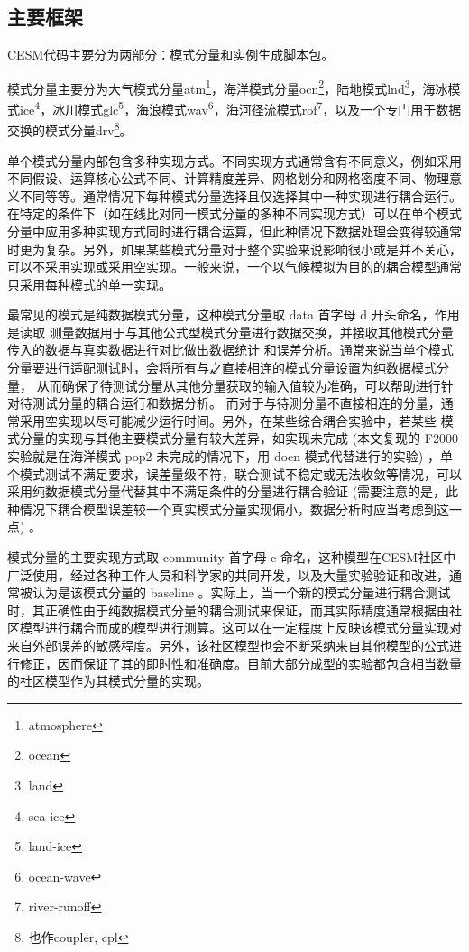 \subsection{主要框架}

CESM代码主要分为两部分：模式分量和实例生成脚本包。

模式分量主要分为大气模式分量atm\footnote {atmosphere}，海洋模式分量ocn\footnote {ocean}，陆地模式lnd\footnote {land}，海冰模式ice\footnote {sea-ice}，冰川模式glc\footnote {land-ice}，海浪模式wav\footnote {ocean-wave}，海河径流模式rof\footnote {river-runoff}，以及一个专门用于数据交换的模式分量drv\footnote {也作coupler, cpl}。

单个模式分量内部包含多种实现方式。不同实现方式通常含有不同意义，例如采用不同假设、运算核心公式不同、计算精度差异、网格划分和网格密度不同、物理意义不同等等。通常情况下每种模式分量选择且仅选择其中一种实现进行耦合运行。在特定的条件下（如在线比对同一模式分量的多种不同实现方式）可以在单个模式分量中应用多种实现方式同时进行耦合运算，但此种情况下数据处理会变得较通常时更为复杂。另外，如果某些模式分量对于整个实验来说影响很小或是并不关心，可以不采用实现或采用空实现。一般来说，一个以气候模拟为目的的耦合模型通常只采用每种模式的单一实现。

最常见的模式是纯数据模式分量，这种模式分量取 data 首字母 d 开头命名，作用是读取
测量数据用于与其他公式型模式分量进行数据交换，并接收其他模式分量传入的数据与真实数据进行对比做出数据统计
和误差分析。通常来说当单个模式分量要进行适配测试时，会将所有与之直接相连的模式分量设置为纯数据模式分量，
从而确保了待测试分量从其他分量获取的输入值较为准确，可以帮助进行针对待测试分量的耦合运行和数据分析。
而对于与待测分量不直接相连的分量，通常采用空实现以尽可能减少运行时间。另外，在某些综合耦合实验中，若某些
模式分量的实现与其他主要模式分量有较大差异，如实现未完成
(本文复现的 F2000 实验就是在海洋模式 pop2 未完成的情况下，用 docn 模式代替进行的实验)
，单个模式测试不满足要求，误差量级不符，联合测试不稳定或无法收敛等情况，可以采用纯数据模式分量代替其中不满足条件的分量进行耦合验证
(需要注意的是，此种情况下耦合模型误差较一个真实模式分量实现偏小，数据分析时应当考虑到这一点)
。

模式分量的主要实现方式取 community 首字母 c 命名，这种模型在CESM社区中广泛使用，经过各种工作人员和科学家的共同开发，以及大量实验验证和改进，通常被认为是该模式分量的 baseline 。实际上，当一个新的模式分量进行耦合测试时，其正确性由于纯数据模式分量的耦合测试来保证，而其实际精度通常根据由社区模型进行耦合而成的模型进行测算。这可以在一定程度上反映该模式分量实现对来自外部误差的敏感程度。另外，该社区模型也会不断采纳来自其他模型的公式进行修正，因而保证了其的即时性和准确度。目前大部分成型的实验都包含相当数量的社区模型作为其模式分量的实现。

